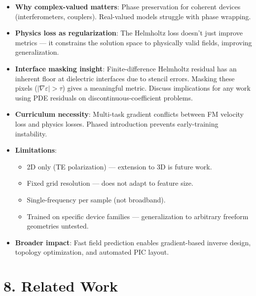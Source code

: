 \documentclass[11pt,letterpaper]{article}
\begin{document}
\begin{itemize}
    \item \textbf{Why complex-valued matters}: Phase preservation for coherent devices (interferometers, couplers). Real-valued models struggle with phase wrapping.
    \item \textbf{Physics loss as regularization}: The Helmholtz loss doesn't just improve metrics --- it constrains the solution space to physically valid fields, improving generalization.
    \item \textbf{Interface masking insight}: Finite-difference Helmholtz residual has an inherent floor at dielectric interfaces due to stencil errors. Masking these pixels ($|\nabla\varepsilon| > \tau$) gives a meaningful metric. Discuss implications for any work using PDE residuals on discontinuous-coefficient problems.
    \item \textbf{Curriculum necessity}: Multi-task gradient conflicts between FM velocity loss and physics losses. Phased introduction prevents early-training instability.
    \item \textbf{Limitations}:
    \begin{itemize}
        \item 2D only (TE polarization) --- extension to 3D is future work.
        \item Fixed grid resolution --- does not adapt to feature size.
        \item Single-frequency per sample (not broadband).
        \item Trained on specific device families --- generalization to arbitrary freeform geometries untested.
    \end{itemize}
    \item \textbf{Broader impact}: Fast field prediction enables gradient-based inverse design, topology optimization, and automated PIC layout.
\end{itemize}

\section{8. Related Work}
\end{document}
